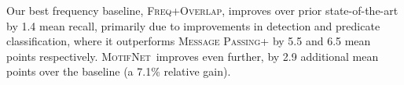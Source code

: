 \documentclass[10pt,twocolumn,letterpaper]{article}
\newcommand{\model}{\textsc{MotifNet}}
\begin{document}
Our best frequency baseline, \textsc{Freq+Overlap}, improves over prior state-of-the-art by 1.4 mean recall, primarily due to improvements in detection and predicate classification, where it outperforms \textsc{Message Passing+} by 5.5 and 6.5 mean points respectively. 
\model~improves even further, by 2.9 additional mean points over the baseline (a 7.1\% relative gain).  
\end{document}

